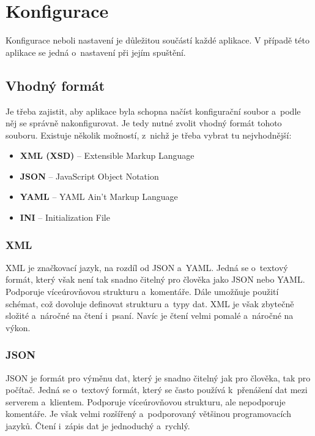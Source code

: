 \newpage

\section{Konfigurace}
Konfigurace neboli nastavení je důležitou součástí každé aplikace.
V případě této aplikace se jedná o~nastavení při jejím spuštění.

\subsection{Vhodný formát}
Je třeba zajistit, aby aplikace byla schopna načíst konfigurační soubor a~podle něj se správně nakonfigurovat.
Je tedy nutné zvolit vhodný formát tohoto souboru.
Existuje několik možností, z~nichž je třeba vybrat tu nejvhodnější:

\begin{itemize}
    \item \textbf{XML (XSD)} -- Extensible Markup Language
    \item \textbf{JSON} -- JavaScript Object Notation
    \item \textbf{YAML} -- YAML Ain't Markup Language
    \item \textbf{INI} -- Initialization File
\end{itemize}

\subsubsection*{XML}
\cite{cisco_xml_json_yaml}
XML je značkovací jazyk, na rozdíl od JSON a~YAML.
Jedná se o~textový formát, který však není tak snadno čitelný pro člověka jako JSON nebo YAML.
Podporuje víceúrovňovou strukturu a~komentáře.
Dále umožňuje použití schémat, což dovoluje definovat strukturu a~typy dat.
XML je však zbytečně složité a~náročné na čtení i~psaní.
Navíc je čtení velmi pomalé a~náročné na výkon.

\subsubsection*{JSON}
\cite{cisco_xml_json_yaml}
JSON je formát pro výměnu dat, který je snadno čitelný jak pro člověka, tak pro počítač.
Jedná se o~textový formát, který se často používá k~přenášení dat mezi serverem a~klientem.
Podporuje víceúrovňovou strukturu, ale nepodporuje komentáře.
Je však velmi rozšířený a~podporovaný většinou programovacích jazyků.
Čtení i~zápis dat je jednoduchý a~rychlý.

